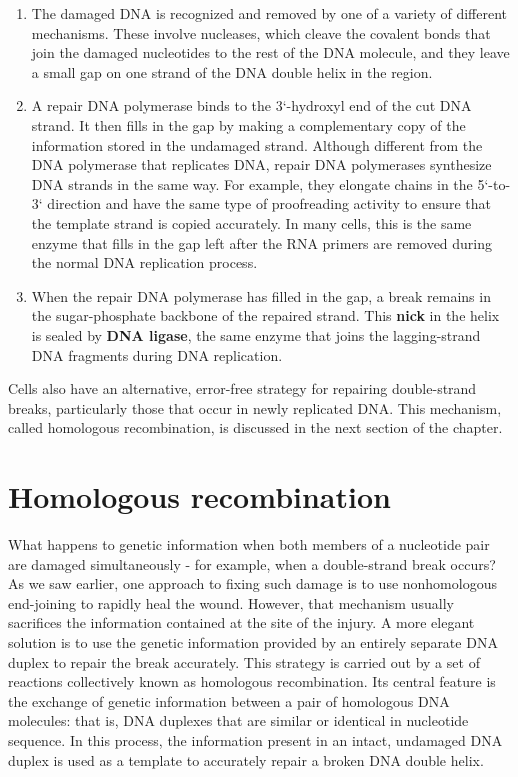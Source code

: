 \begin{enumerate}
\item The damaged DNA is recognized and removed by one of a variety
of different mechanisms. These involve nucleases, which cleave
the covalent bonds that join the damaged nucleotides to the rest of
the DNA molecule, and they leave a small gap on one strand of the
DNA double helix in the region.
\item A repair DNA polymerase binds to the 3`-hydroxyl end of the cut
DNA strand. It then fills in the gap by making a complementary
copy of the information stored in the undamaged strand. Although
different from the DNA polymerase that replicates DNA, repair
DNA polymerases synthesize DNA strands in the same way. For
example, they elongate chains in the 5`-to-3` direction and have
the same type of proofreading activity to ensure that the template
strand is copied accurately. In many cells, this is the same enzyme
that fills in the gap left after the RNA primers are removed during
the normal DNA replication process.
\item When the repair DNA polymerase has filled in the gap, a break
remains in the sugar-phosphate backbone of the repaired strand.
This \textbf{nick} in the helix is sealed by \textbf{DNA ligase}, the same enzyme that
joins the lagging-strand DNA fragments during DNA replication.
\end{enumerate}

Cells also have an alternative, error-free strategy for repairing double-strand
breaks, particularly those that occur in newly replicated DNA. This
mechanism, called homologous recombination, is discussed in the next
section of the chapter.

\section{Homologous recombination}

What happens to genetic information when both members of a
nucleotide pair are damaged simultaneously - for example, when a
double-strand break occurs? As we saw earlier, one approach to fixing
such damage is to use nonhomologous end-joining to rapidly heal the
wound. However, that mechanism usually sacrifices the information
contained at the site of the injury. A more elegant solution is to use the
genetic information provided by an entirely separate DNA duplex to repair
the break accurately. This strategy is carried out by a set of reactions
collectively known as homologous recombination. Its central feature
is the exchange of genetic information between a pair of homologous
DNA molecules: that is, DNA duplexes that are similar or identical
in nucleotide sequence. In this process, the information present in an
intact, undamaged DNA duplex is used as a template to accurately repair
a broken DNA double helix.

